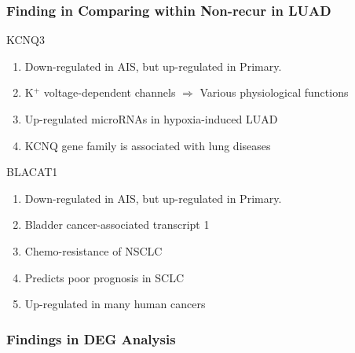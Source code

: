 \documentclass{beamer}
\begin{document}
    \begin{frame}[allowframebreaks]
        \frametitle{Finding in Comparing within Non-recur in LUAD}

        \begin{block}{KCNQ3}
            \begin{enumerate}
                \item Down-regulated in AIS, but up-regulated in Primary.
                \item K$^+$ voltage-dependent channels $\Rightarrow$ Various physiological functions \cite{KCNQ3-1, KCNQ3-2, KCNQ3-3}
                \item Up-regulated microRNAs in hypoxia-induced LUAD \cite{KCNQ3-4}
                \item KCNQ gene family is associated with lung diseases \cite{KCNQ3-5}
            \end{enumerate}
        \end{block}

        \begin{block}{BLACAT1}
            \begin{enumerate}
                \item Down-regulated in AIS, but up-regulated in Primary.
                \item Bladder cancer-associated transcript 1
                \item Chemo-resistance of NSCLC \cite{BLACAT1-1}
                \item Predicts poor prognosis in SCLC \cite{BLACAT1-2}
                \item Up-regulated in many human cancers \cite{BLACAT1-3}
            \end{enumerate}
        \end{block}
    \end{frame}

    \begin{frame}
        \frametitle{Findings in DEG Analysis}
    \end{frame}
\end{document}

